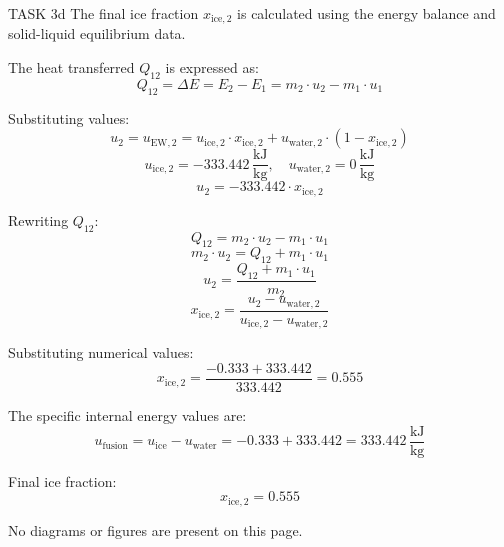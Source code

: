 TASK 3d  
The final ice fraction \( x_{\text{ice},2} \) is calculated using the energy balance and solid-liquid equilibrium data.  

The heat transferred \( Q_{12} \) is expressed as:  
\[
Q_{12} = \Delta E = E_2 - E_1 = m_2 \cdot u_2 - m_1 \cdot u_1
\]  

Substituting values:  
\[
u_2 = u_{\text{EW},2} = u_{\text{ice},2} \cdot x_{\text{ice},2} + u_{\text{water},2} \cdot (1 - x_{\text{ice},2})
\]  
\[
u_{\text{ice},2} = -333.442 \, \frac{\text{kJ}}{\text{kg}}, \quad u_{\text{water},2} = 0 \, \frac{\text{kJ}}{\text{kg}}
\]  
\[
u_2 = -333.442 \cdot x_{\text{ice},2}
\]  

Rewriting \( Q_{12} \):  
\[
Q_{12} = m_2 \cdot u_2 - m_1 \cdot u_1
\]  
\[
m_2 \cdot u_2 = Q_{12} + m_1 \cdot u_1
\]  
\[
u_2 = \frac{Q_{12} + m_1 \cdot u_1}{m_2}
\]  
\[
x_{\text{ice},2} = \frac{u_2 - u_{\text{water},2}}{u_{\text{ice},2} - u_{\text{water},2}}
\]  

Substituting numerical values:  
\[
x_{\text{ice},2} = \frac{-0.333 + 333.442}{333.442} = 0.555
\]  

The specific internal energy values are:  
\[
u_{\text{fusion}} = u_{\text{ice}} - u_{\text{water}} = -0.333 + 333.442 = 333.442 \, \frac{\text{kJ}}{\text{kg}}
\]  

Final ice fraction:  
\[
x_{\text{ice},2} = 0.555
\]  

No diagrams or figures are present on this page.